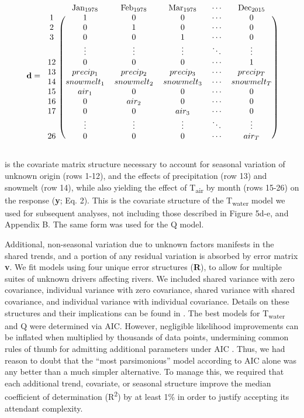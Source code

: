\documentclass[notitlepage]{article}
\begin{document}
$$
\textbf{d} = \begin{blockarray}{cccccc}
& \textrm{Jan}_{1978} & \textrm{Feb}_{1978} & \textrm{Mar}_{1978} & \cdots & \textrm{Dec}_{2015} \\
\begin{block}{c(ccccc)}
    1 & 1 & 0 & 0 & \cdots & 0 \\
    2 & 0 & 1 & 0 & \cdots & 0 \\
    3 & 0 & 0 & 1 & \cdots & 0 \\
      & \vdots & \vdots & \vdots & \ddots & \vdots \\
    12 & 0 & 0 & 0 & \cdots & 1 \\
    13 & precip_1 & precip_2 & precip_3 & \cdots & precip_T \\
    14 & snowmelt_1 & snowmelt_2 & snowmelt_3 & \cdots & snowmelt_T \\
    15 & air_1 & 0 & 0 & \cdots & 0 \\
    16 & 0 & air_2 & 0 & \cdots & 0 \\
    17 & 0 & 0 & air_3 & \cdots & 0 \\
      & \vdots & \vdots & \vdots & \ddots & \vdots \\
    26 & 0 & 0 & 0 & \cdots & air_T \\
\end{block}
\end{blockarray}
$$

\noindent
is the covariate matrix structure necessary to account for seasonal variation of unknown origin (rows 1-12), and the effects of precipitation (row 13) and snowmelt (row 14), while also yielding the effect of T\textsubscript{air} by month (rows 15-26) on the response (\textbf{y}; Eq. 2). This is the covariate structure of the T\textsubscript{water} model we used for subsequent analyses, not including those described in Figure 5d-e, and Appendix B. The same form was used for the Q model.

Additional, non-seasonal variation due to unknown factors manifests in the shared trends, and a portion of any residual variation is absorbed by error matrix \textbf{v}. We fit models using four unique error structures (\textbf{R}), to allow for multiple suites of unknown drivers affecting rivers. We included shared variance with zero covariance, individual variance with zero covariance, shared variance with shared covariance, and individual variance with individual covariance. Details on these structures and their implications can be found in \citep{holmes2012marss}. The best models for T\textsubscript{water} and Q were determined via AIC. However, negligible likelihood improvements can be inflated when multiplied by thousands of data points, undermining common rules of thumb for admitting additional parameters under AIC \citep{burnham2003model}. Thus, we had reason to doubt that the ``most parsimonious'' model according to AIC alone was any better than a much simpler alternative. To manage this, we required that each additional trend, covariate, or seasonal structure improve the median coefficient of determination (R\textsuperscript{2}) by at least 1\% in order to justify accepting its attendant complexity.
\end{document}
